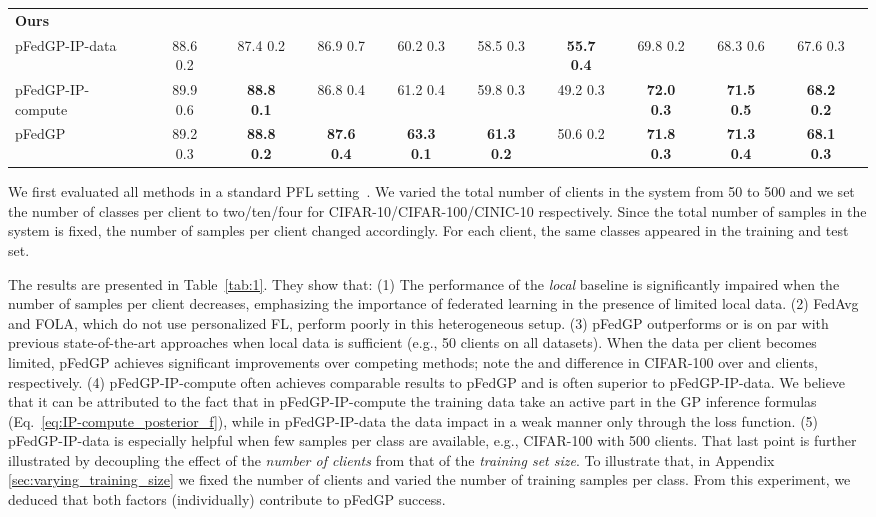 \documentclass{article}
\def\Eqref#1{Eq.~\ref{#1}}
\newcommand{\tblref}[1]{Table~\ref{#1}}
\begin{document}
\begin{table*}[!t]
{\begin{tabular}{l c cc cc cc c cc cc cc c cc cc}
    \midrule
    \textbf{Ours} && && && && && && && && &&\\
    pFedGP-IP-data && 88.6  0.2 && 87.4  0.2 && 86.9  0.7 && 60.2  0.3 && 58.5  0.3 && \textbf{55.7  0.4} && 69.8  0.2 && 68.3  0.6 && 67.6  0.3 \\
    pFedGP-IP-compute && 89.9  0.6 && \textbf{88.8  0.1} && 86.8  0.4 && 61.2  0.4 && 59.8  0.3 && 49.2  0.3 && \textbf{72.0  0.3} && \textbf{71.5  0.5} && \textbf{68.2  0.2} \\
    pFedGP &&  89.2  0.3 && \textbf{88.8  0.2} && \textbf{87.6  0.4} && \textbf{63.3  0.1} && \textbf{61.3  0.2} && 50.6  0.2 && \textbf{71.8  0.3} && \textbf{71.3  0.4} && \textbf{68.1  0.3} \\
    \bottomrule
    \end{tabular}
}
\label{tab:1}
\end{table*}
We first evaluated all methods in a standard PFL setting~\cite{shamsian2021personalized_icml, t2020personalized}.
We varied the total number of clients in the system from 50 to 500 and we set the number of classes per client to two/ten/four for CIFAR-10/CIFAR-100/CINIC-10 respectively. Since the total number of samples in the system is fixed, the number of samples per client changed accordingly.
For each client, the same classes appeared in the training and test set.  

The results are presented in \tblref{tab:1}. They show that: (1) The performance of the \textit{local} baseline is significantly impaired when the number of samples per client decreases, emphasizing the importance of federated learning in the presence of limited local data. (2) FedAvg and FOLA, which do not use personalized FL, perform poorly in this heterogeneous setup. (3) pFedGP outperforms or is on par with previous state-of-the-art approaches when local data is sufficient (e.g., 50 clients on all datasets). When the data per client becomes limited, pFedGP achieves significant improvements over competing methods; note the  and  difference in CIFAR-100 over  and  clients, respectively. (4) pFedGP-IP-compute often achieves comparable results to pFedGP and is often superior to pFedGP-IP-data. We believe that it can be attributed to the fact that in pFedGP-IP-compute the training data take an active part in the GP inference formulas (\Eqref{eq:IP-compute_posterior_f}), while in pFedGP-IP-data the data impact in a weak manner only through the loss function. (5) pFedGP-IP-data is especially helpful when few samples per class are available, e.g., CIFAR-100 with 500 clients. That last point is further illustrated by decoupling the effect of the \textit{number of clients} from that of the \textit{training set size}. To illustrate that, in Appendix \ref{sec:varying_training_size} we fixed the number of clients and varied the number of training samples per class. From this experiment, we deduced that both factors (individually) contribute to pFedGP success.
\end{document}
